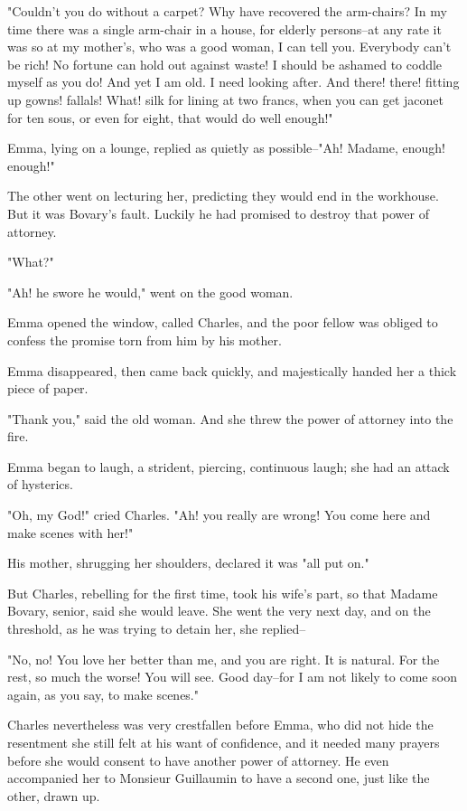 \documentclass[11pt,twocolumn]{ltugboat}
\begin{document}
"Couldn't you do without a carpet? Why have recovered the arm-chairs? In
my time there was a single arm-chair in a house, for elderly persons--at
any rate it was so at my mother's, who was a good woman, I can tell you.
Everybody can't be rich! No fortune can hold out against waste! I should
be ashamed to coddle myself as you do! And yet I am old. I need looking
after. And there! there! fitting up gowns! fallals! What! silk for
lining at two francs, when you can get jaconet for ten sous, or even for
eight, that would do well enough!"

Emma, lying on a lounge, replied as quietly as possible--"Ah! Madame,
enough! enough!"

The other went on lecturing her, predicting they would end in the
workhouse. But it was Bovary's fault. Luckily he had promised to destroy
that power of attorney.

"What?"

"Ah! he swore he would," went on the good woman.

Emma opened the window, called Charles, and the poor fellow was obliged
to confess the promise torn from him by his mother.

Emma disappeared, then came back quickly, and majestically handed her a
thick piece of paper.

"Thank you," said the old woman. And she threw the power of attorney
into the fire.

Emma began to laugh, a strident, piercing, continuous laugh; she had an
attack of hysterics.

"Oh, my God!" cried Charles. "Ah! you really are wrong! You come here
and make scenes with her!"

His mother, shrugging her shoulders, declared it was "all put on."

But Charles, rebelling for the first time, took his wife's part, so that
Madame Bovary, senior, said she would leave. She went the very next day,
and on the threshold, as he was trying to detain her, she replied--

"No, no! You love her better than me, and you are right. It is natural.
For the rest, so much the worse! You will see. Good day--for I am not
likely to come soon again, as you say, to make scenes."

Charles nevertheless was very crestfallen before Emma, who did not hide
the resentment she still felt at his want of confidence, and it needed
many prayers before she would consent to have another power of attorney.
He even accompanied her to Monsieur Guillaumin to have a second one,
just like the other, drawn up.
\end{document}
